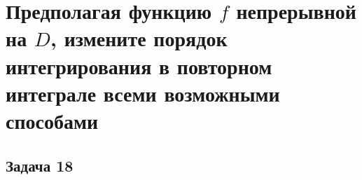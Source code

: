 \documentclass[a4paper, fleqn]{article}
\begin{document}
    \section*{Предполагая функцию $f$ непрерывной на $D$, измените порядок интегрирования в повторном интеграле
    всеми возможными способами}
    
    \subsection*{Задача 18}
    
    
    
    
    
\end{document}
